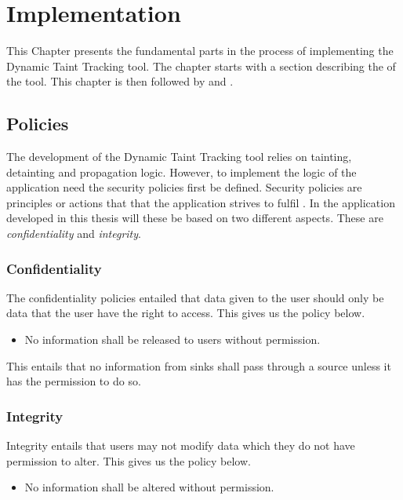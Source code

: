 \chapter{Implementation}
This Chapter presents the fundamental parts in the process of implementing the Dynamic Taint Tracking tool. The chapter starts with a section describing the \textit{} of the tool. This chapter is then followed by \textit{} and \textit{}.



\section{Policies}
\label{Policies}
The development of the Dynamic Taint Tracking tool relies on tainting, detainting and propagation logic. However, to implement the logic of the application need the security policies first be defined. Security policies are principles or actions that that the application strives to fulfil \parencite{BayukJenniferL2012Cspg}. In the application developed in this thesis will these be based on two different aspects. These are \textit{confidentiality} and \textit{integrity}.



\subsection{Confidentiality}
The confidentiality policies entailed that data given to the user should only be data that the user have the right to access. This gives us the policy below.

\hfill
\begin{itemize}
	\item No information shall be released to users without permission.
\end{itemize}
\hfill

This entails that no information from sinks shall pass through a source unless it has the permission to do so.


\subsection{Integrity}
Integrity entails that users may not modify data which they do not have permission to alter. This gives us the policy below.

\hfill
\begin{itemize}
	\item No information shall be altered without permission.
\end{itemize}
\hfill

